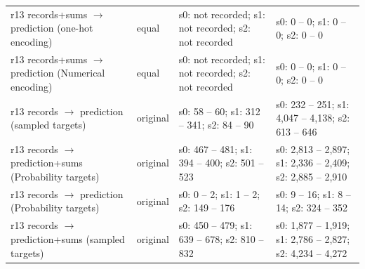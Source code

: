 \begin{longtable}{@{}>{\raggedright\arraybackslash}p{1.700in}>{\raggedright\arraybackslash}p{0.400in}>{\raggedright\arraybackslash}p{2.000in}>{\raggedright\arraybackslash}p{2.000in}@{}}
r13 records+sums $\to$ prediction (one-hot encoding) & equal & s0: not recorded; s1: not recorded; s2: not recorded & s0: 0 -- 0; s1: 0 -- 0; s2: 0 -- 0 \\
r13 records+sums $\to$ prediction (Numerical encoding) & equal & s0: not recorded; s1: not recorded; s2: not recorded & s0: 0 -- 0; s1: 0 -- 0; s2: 0 -- 0 \\
r13 records $\to$ prediction (sampled targets) & original & s0: 58 -- 60; s1: 312 -- 341; s2: 84 -- 90 & s0: 232 -- 251; s1: 4,047 -- 4,138; s2: 613 -- 646 \\
r13 records $\to$ prediction+sums (Probability targets) & original & s0: 467 -- 481; s1: 394 -- 400; s2: 501 -- 523 & s0: 2,813 -- 2,897; s1: 2,336 -- 2,409; s2: 2,885 -- 2,910 \\*
r13 records $\to$ prediction (Probability targets) & original & s0: 0 -- 2; s1: 1 -- 2; s2: 149 -- 176 & s0: 9 -- 16; s1: 8 -- 14; s2: 324 -- 352 \\*
r13 records $\to$ prediction+sums (sampled targets) & original & s0: 450 -- 479; s1: 639 -- 678; s2: 810 -- 832 & s0: 1,877 -- 1,919; s1: 2,786 -- 2,827; s2: 4,234 -- 4,272 \\
\end{longtable}
\endgroup
